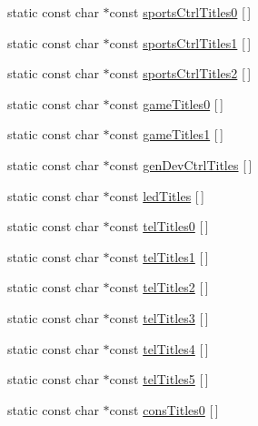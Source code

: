 \begin{DoxyCompactItemize}
static const char $\ast$const \hyperlink{class_report_desc_parser_base_a4daf2daa3c18f446a66854475ca56a66}{sports\-Ctrl\-Titles0} \mbox{[}$\,$\mbox{]}
\item 
static const char $\ast$const \hyperlink{class_report_desc_parser_base_a24a3f083c728c7549929cb8af0e52451}{sports\-Ctrl\-Titles1} \mbox{[}$\,$\mbox{]}
\item 
static const char $\ast$const \hyperlink{class_report_desc_parser_base_a9491a62b6a44bf98884ca1dd16b45df2}{sports\-Ctrl\-Titles2} \mbox{[}$\,$\mbox{]}
\item 
static const char $\ast$const \hyperlink{class_report_desc_parser_base_a981cacbfad335b19528e59ab2de866e5}{game\-Titles0} \mbox{[}$\,$\mbox{]}
\item 
static const char $\ast$const \hyperlink{class_report_desc_parser_base_ac9327d02115b1dd60c79c37d1d11cf41}{game\-Titles1} \mbox{[}$\,$\mbox{]}
\item 
static const char $\ast$const \hyperlink{class_report_desc_parser_base_a55e8f870eb0006bc3a9ca42e6cabf187}{gen\-Dev\-Ctrl\-Titles} \mbox{[}$\,$\mbox{]}
\item 
static const char $\ast$const \hyperlink{class_report_desc_parser_base_a7425dac090961547ddf7622112b98a9e}{led\-Titles} \mbox{[}$\,$\mbox{]}
\item 
static const char $\ast$const \hyperlink{class_report_desc_parser_base_ae86d70945d59c48153463bca302bd356}{tel\-Titles0} \mbox{[}$\,$\mbox{]}
\item 
static const char $\ast$const \hyperlink{class_report_desc_parser_base_a9e83e4d47816c0330ccae5bd31e10031}{tel\-Titles1} \mbox{[}$\,$\mbox{]}
\item 
static const char $\ast$const \hyperlink{class_report_desc_parser_base_aefc1ad5b2631c5184c5e58ac44cfbb80}{tel\-Titles2} \mbox{[}$\,$\mbox{]}
\item 
static const char $\ast$const \hyperlink{class_report_desc_parser_base_acc9f0e2b103473be060684e451432661}{tel\-Titles3} \mbox{[}$\,$\mbox{]}
\item 
static const char $\ast$const \hyperlink{class_report_desc_parser_base_a9d51bfc5c2e04a8eaf25561d6d97ae00}{tel\-Titles4} \mbox{[}$\,$\mbox{]}
\item 
static const char $\ast$const \hyperlink{class_report_desc_parser_base_a3882e20433145daa93bd23d4cff779e9}{tel\-Titles5} \mbox{[}$\,$\mbox{]}
\item 
static const char $\ast$const \hyperlink{class_report_desc_parser_base_a81af202145ab2899b222170b0d681213}{cons\-Titles0} \mbox{[}$\,$\mbox{]}

\end{DoxyCompactItemize}
